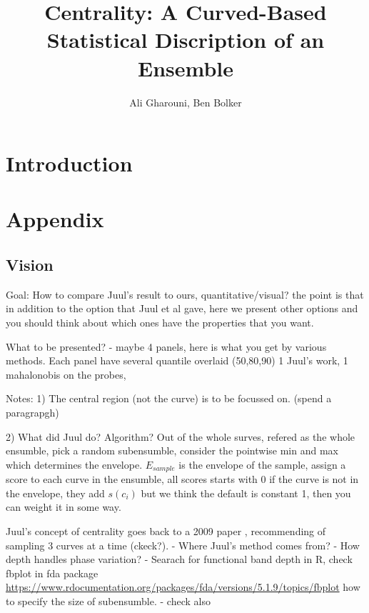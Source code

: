 \documentclass[12pt]{article}
\title{Centrality: A Curved-Based Statistical Discription of an Ensemble}
\author{Ali Gharouni, Ben Bolker}
\theoremstyle{definition} %
\begin{document}
\maketitle
\linenumbers

\section{Introduction}




\section{Appendix}

\subsection{Vision}

Goal: 
 How to compare Juul's result to ours, quantitative/visual? the point is that in addition to the option that Juul et al gave, here we present other options and you should think about which ones have the properties that you want.
 
What to be presented? 
- maybe 4 panels, here is what you get by various methods. Each panel have several quantile overlaid (50,80,90) 1 Juul's work, 1 mahalonobis on the probes,  

Notes:
1) The central region (not the curve) is to be focussed on. (spend a paragrapgh) 

2) What did Juul do? Algorithm? 
Out of the whole surves, refered as the whole ensumble, pick a random subensumble, consider the pointwise min and max which determines the envelope. $E_{sample}$ is the envelope of the sample, assign a score to each curve in the ensumble, all scores starts with 0 if the curve is not in the envelope, they add $s(c_i)$ but we think the default is constant 1, then you can weight it in some way. 

Juul's concept of centrality goes back to a 2009 paper \cite{lopez2009concept}, recommending of sampling 3 curves at a time (ckeck?). 
- Where Juul's method comes from?
- How depth handles phase variation?
- Searach for functional band depth in R, check fbplot in fda package \url{https://www.rdocumentation.org/packages/fda/versions/5.1.9/topics/fbplot} how to specify the size of subensumble.
- check also \cite{sun2012exact}
\end{document}
